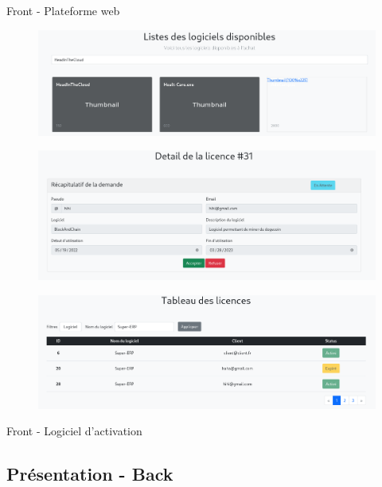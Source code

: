 \documentclass{cubeamer}
\begin{document}
\begin{frame}{Front - Plateforme web}
    \begin{figure}
        \includegraphics[scale=0.2]{img/web1.png}
    \end{figure}       
    \begin{figure}
        \includegraphics[scale=0.2]{img/web2.png}
    \end{figure}
    \begin{figure}
        \includegraphics[scale=0.2]{img/web3.png}
    \end{figure}
\end{frame}

\begin{frame}{Front - Logiciel d'activation}
    
\end{frame}

\subsection{Présentation - Back}
\end{document}
